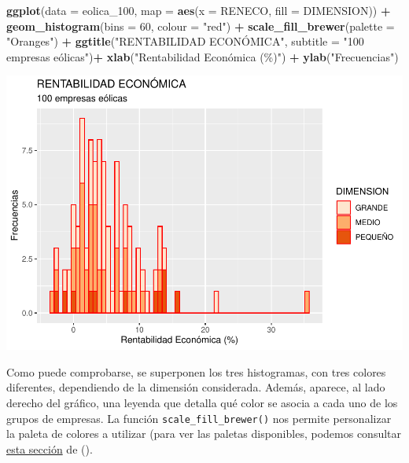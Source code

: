 \documentclass[
]{book}
\newenvironment{Shaded}{\begin{snugshade}}{\end{snugshade}}
\newcommand{\AttributeTok}[1]{\textcolor[rgb]{0.13,0.29,0.53}{#1}}
\newcommand{\DecValTok}[1]{\textcolor[rgb]{0.00,0.00,0.81}{#1}}
\newcommand{\FunctionTok}[1]{\textcolor[rgb]{0.13,0.29,0.53}{\textbf{#1}}}
\newcommand{\NormalTok}[1]{#1}
\newcommand{\SpecialCharTok}[1]{\textcolor[rgb]{0.81,0.36,0.00}{\textbf{#1}}}
\newcommand{\StringTok}[1]{\textcolor[rgb]{0.31,0.60,0.02}{#1}}
\let\Oldincludegraphics\includegraphics
\renewcommand{\includegraphics}[2][]{%
  \Oldincludegraphics[#1]{#2}%
}
\begin{document}
\begin{Shaded}
\begin{Highlighting}[]
\FunctionTok{ggplot}\NormalTok{(}\AttributeTok{data =}\NormalTok{ eolica\_100, }\AttributeTok{map =} \FunctionTok{aes}\NormalTok{(}\AttributeTok{x =}\NormalTok{ RENECO, }\AttributeTok{fill =}\NormalTok{ DIMENSION)) }\SpecialCharTok{+}
  \FunctionTok{geom\_histogram}\NormalTok{(}\AttributeTok{bins =} \DecValTok{60}\NormalTok{, }\AttributeTok{colour =} \StringTok{"red"}\NormalTok{) }\SpecialCharTok{+}
  \FunctionTok{scale\_fill\_brewer}\NormalTok{(}\AttributeTok{palette =} \StringTok{"Oranges"}\NormalTok{) }\SpecialCharTok{+}
  \FunctionTok{ggtitle}\NormalTok{(}\StringTok{"RENTABILIDAD ECONÓMICA"}\NormalTok{, }\AttributeTok{subtitle =} \StringTok{"100 empresas eólicas"}\NormalTok{)}\SpecialCharTok{+}
  \FunctionTok{xlab}\NormalTok{(}\StringTok{"Rentabilidad Económica (\%)"}\NormalTok{) }\SpecialCharTok{+}
  \FunctionTok{ylab}\NormalTok{(}\StringTok{"Frecuencias"}\NormalTok{)}
\end{Highlighting}
\end{Shaded}

\includegraphics{_main_files/figure-latex/unnamed-chunk-110-1.pdf}

Como puede comprobarse, se superponen los tres histogramas, con tres colores diferentes, dependiendo de la dimensión considerada. Además, aparece, al lado derecho del gráfico, una leyenda que detalla qué color se asocia a cada uno de los grupos de empresas. La función \texttt{scale\_fill\_brewer()} nos permite personalizar la paleta de colores a utilizar (para ver las paletas disponibles, podemos consultar \href{https://ggplot2-book.org/scales-colour}{esta sección} de ().
\end{document}
